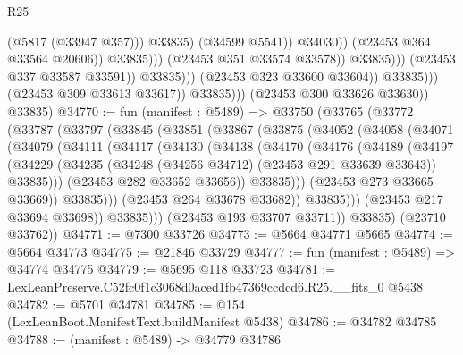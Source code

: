 \begin{lexlean}{R25}
\begin{coremodule}
                                                          (@5817 (@33947 @357)))
                                                        @33835)
                                                      (@34599 @5541))
                                                    @34030))
                                                (@23453 @364 @33564 @20606))
                                              @33835)))
                                        (@23453 @351 @33574 @33578))
                                      @33835)))
                                (@23453 @337 @33587 @33591))
                              @33835)))
                        (@23453 @323 @33600 @33604))
                      @33835)))
                (@23453 @309 @33613 @33617))
              @33835)))
        (@23453 @300 @33626 @33630))
      @33835)
@34770 := fun (manifest : @5489) =>
  @33750
    (@33765
      (@33772
        (@33787
          (@33797
            (@33845
              (@33851
                (@33867
                  (@33875
                    (@34052
                      (@34058
                        (@34071
                          (@34079
                            (@34111
                              (@34117
                                (@34130
                                  (@34138
                                    (@34170
                                      (@34176
                                        (@34189
                                          (@34197
                                            (@34229
                                              (@34235
                                                (@34248 (@34256 @34712) (@23453 @291 @33639 @33643))
                                                @33835)))
                                          (@23453 @282 @33652 @33656))
                                        @33835)))
                                  (@23453 @273 @33665 @33669))
                                @33835)))
                          (@23453 @264 @33678 @33682))
                        @33835)))
                  (@23453 @217 @33694 @33698))
                @33835)))
          (@23453 @193 @33707 @33711))
        @33835)
      (@23710 @33762))
@34771 := @7300 @33726
@34773 := @5664 @34771 @5665
@34774 := @5664 @34773
@34775 := @21846 @33729
@34777 := fun (manifest : @5489) => @34774 @34775
@34779 := @5695 @118 @33723
@34781 := LexLeanPreserve.C52fc0f1c3068d0aced1fb47369ccdcd6.R25.__fits_0 @5438
@34782 := @5701 @34781
@34785 := @154 (LexLeanBoot.ManifestText.buildManifest @5438)
@34786 := @34782 @34785
@34788 := (manifest : @5489) -> @34779 @34786

\end{coremodule}
\end{lexlean}
